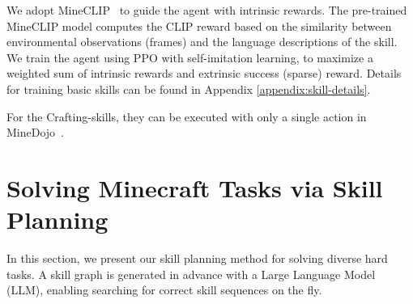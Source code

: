 \documentclass{article}
\begin{document}
We adopt MineCLIP~\citep{minedojo} to guide the agent with intrinsic rewards. The pre-trained MineCLIP model computes the CLIP reward based on the similarity between environmental observations (frames) and the language descriptions of the skill. We train the agent using PPO with self-imitation learning, to maximize a weighted sum of intrinsic rewards and extrinsic success (sparse) reward. 
Details for training basic skills can be found in Appendix \ref{appendix:skill-details}. 

For the Crafting-skills, they can be executed with only a single action in MineDojo~\citep{minedojo}.




\section{Solving Minecraft Tasks via Skill Planning}
In this section, we present our skill planning method for solving diverse hard tasks. A skill graph is generated in advance with a Large Language Model (LLM), enabling searching for correct skill sequences on the fly.

\end{document}
